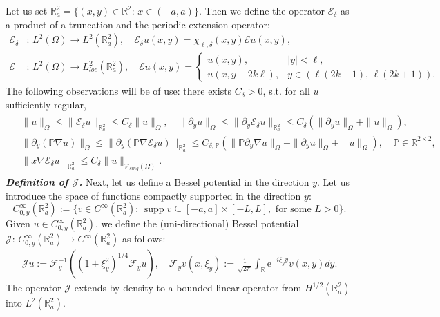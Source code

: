 \documentclass[report]{elsarticle}
\numberwithin{theorem}{section}
\begin{document}
Let us set $\mathbb{R}^2_a=\{(x,y)\in \mathbb{R}^2: \, x\in (-a, a)\}$. Then we define the operator $\mathcal{E}_{\delta}$ as a product of a truncation and the periodic extension operator: 
\begin{align*}
	\mathcal{E}_{\delta}&: \,L^2(\Omega)\rightarrow L^2(\mathbb{R}^2_a), \quad \mathcal{E}_{\delta}u(x,y)=\chi_{\ell,\delta}(x,y)\mathcal{E}u(x,y),\\[10pt]
	\mathcal{E}&: \,L^2(\Omega)\rightarrow L^2_{loc}(\mathbb{R}^2_a),\quad \mathcal{E}u(x,y)=\left\{
	\begin{array}{ll}
		u(x,y),& |y|<\ell, \\[5pt]
		u(x,y-2k\ell), & y\in (\ell(2k-1),\, \ell(2k+1)).  
	\end{array}
	\right.
\end{align*}
The following observations will be of use: there exists $C_{\delta}>0$, s.t. for all $u$ sufficiently regular, 
\begin{align}
	\label{eq:important_mappings}
	\begin{split}
		&\|u\|_{\Omega}\leq \|\mathcal{E}_{\delta} u\|_{\mathbb{R}^2_a}\leq C_{\delta}\|u\|_{\Omega}, \quad \|\partial_y u\|_{\Omega}\leq \|\partial_y \mathcal{E}_{\delta} u\|_{\mathbb{R}^2_a}\leq C_{\delta}(\|\partial_y u\|_{\Omega}+\|u\|_{\Omega}),\\
		&\|\partial_y (\mathbb{P}\nabla u)\|_{\Omega}\leq \|\partial_y(\mathbb{P} \nabla\mathcal{E}_{\delta}u)\|_{\mathbb{R}^2_a}\leq C_{\delta,\mathbb{P}}( \|\mathbb{P}\partial_y\nabla u\|_{\Omega}+\|\partial_y u\|_{\Omega}+\|u\|_{\Omega}),\quad \mathbb{P}\in \mathbb{R}^{2\times 2},\\
		&\|x\nabla \mathcal{E}_{\delta}u\|_{\mathbb{R}^2_a}\leq C_{\delta} \|u\|_{\mathcal{V}_{sing}(\Omega)}.
	\end{split}
\end{align} 
\textit{\textbf{Definition of $\mathcal{J}$.}} Next, let us define a Bessel potential in the direction $y$. Let us introduce the space of functions compactly supported in the direction $y$: 
$${C}^{\infty}_{0,y}(\mathbb{R}^2_a):=\{v\in C^{\infty}(\mathbb{R}^2_a): \, \operatorname{supp}v \subseteq [-a,a]\times [-L, L], \text{ for some }L>0\}.$$
Given $u\in {C}_{0,y}^{\infty}(\mathbb{R}^2_a)$, we define the (uni-directional) Bessel potential $\mathcal{J}: \, {C}_{0,y}^{\infty}(\mathbb{R}^2_a)\rightarrow {C}^{\infty}(\mathbb{R}^2_a)$ as follows:
\begin{align*}
	\mathcal{J}u:=\mathcal{F}_y^{-1}\left((1+\xi_y^2)^{1/4}\mathcal{F}_y u\right), \quad
	\mathcal{F}_yv(x,\xi_y):=\frac{1}{\sqrt{2\pi}}\int_{\mathbb{R}}\mathrm{e}^{-i\xi_y y}v(x,y)dy. 
\end{align*}
The operator $\mathcal{J}$ extends by density to a bounded linear operator from $H^{1/2}(\mathbb{R}^2_a)$ into $L^2(\mathbb{R}^2_a)$. 
\end{document}
